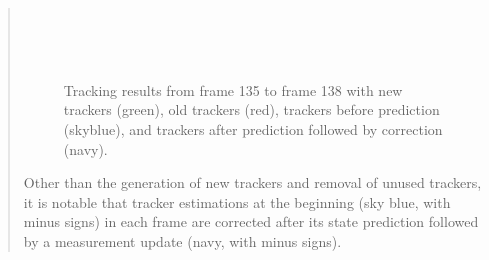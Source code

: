 \documentclass[11pt]{article}
\begin{document}
\begin{quote}
\begin{figure}[h]
    \centering
     \\
     \\
     \\
    \caption{Tracking results from frame 135 to frame 138 with new trackers (green), old trackers (red), trackers before prediction (skyblue), and trackers after prediction followed by correction (navy).}
    \label{fig:q6-2}
\end{figure}

Other than the generation of new trackers and removal of unused trackers, it is notable that tracker estimations at the beginning (sky blue, with minus signs) in each frame are corrected after its state prediction followed by a measurement update (navy, with minus signs). 

\end{quote}
\end{document}
